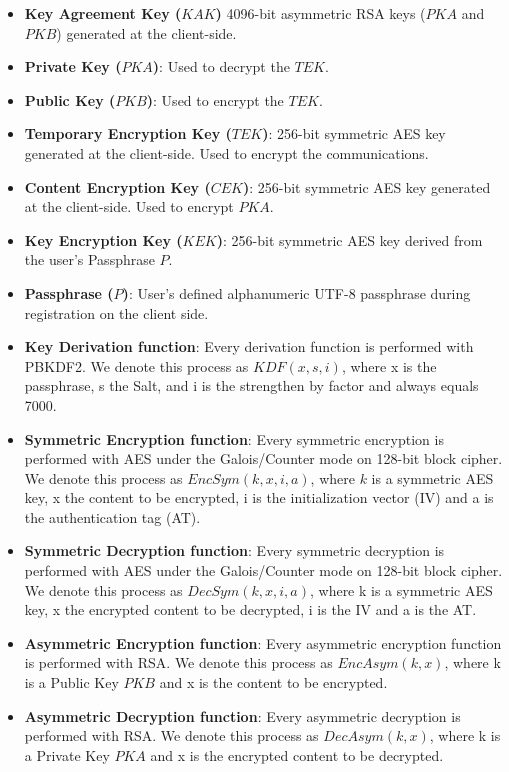 \documentclass[a4paper,10pt]{article}
\begin{document}
\begin{itemize}
    \item \textbf{Key Agreement Key ($KAK$)}
    4096-bit asymmetric RSA keys ($PKA$ and $PKB$) generated at the client-side.
    \item \textbf{Private Key ($PKA$)}:
    Used to decrypt the $TEK$.
    \item \textbf{Public Key ($PKB$)}:
    Used to encrypt the $TEK$.
    \item \textbf{Temporary Encryption Key ($TEK$)}:
    256-bit symmetric AES key generated at the client-side. Used to encrypt the communications.
    \item \textbf{Content Encryption Key ($CEK$)}:
    256-bit symmetric AES key generated at the client-side. Used to encrypt $PKA$.
    \item \textbf{Key Encryption Key ($KEK$)}:
    256-bit symmetric AES key derived from the user's Passphrase $P$.
    \item \textbf{Passphrase ($P$)}:
    User's defined alphanumeric UTF-8 passphrase during registration on the client side.
    \item \textbf{Key Derivation function}:
    Every derivation function is performed with PBKDF2. We denote this process as $KDF(x, s, i)$, where x is the passphrase, s the Salt, and i is the strengthen by factor and always equals 7000.
    \item \textbf{Symmetric Encryption function}:
    Every symmetric encryption is performed with AES under the Galois/Counter mode on 128-bit block cipher. We denote this process as $EncSym(k, x, i, a)$, where $k$ is a symmetric AES key, x the content to be encrypted, i is the initialization vector (IV) and a is the authentication tag (AT).
    \item \textbf{Symmetric Decryption function}:
    Every symmetric decryption is performed with AES under the Galois/Counter mode on 128-bit block cipher. We denote this process as $DecSym(k,x,i,a)$, where k is a symmetric AES key, x the encrypted content to be decrypted, i is the IV and a is the AT.
    \item \textbf{Asymmetric Encryption function}:
    Every asymmetric encryption function is performed with RSA. We denote this process as $EncAsym(k,x)$, where k is a Public Key $PKB$ and x is the content to be encrypted.
    \item \textbf{Asymmetric Decryption function}:
    Every asymmetric decryption is performed with RSA. We denote this process as $DecAsym(k,x)$, where k is a Private Key $PKA$ and x is the encrypted content to be decrypted.
    
\end{itemize}
\end{document}
